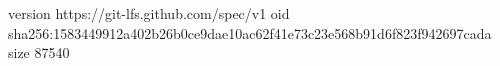 version https://git-lfs.github.com/spec/v1
oid sha256:1583449912a402b26b0ce9dae10ac62f41e73c23e568b91d6f823f942697cada
size 87540
